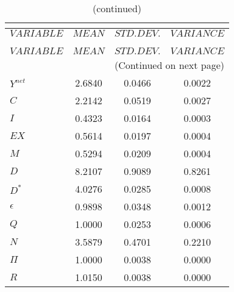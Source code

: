  
\begin{center}
\begin{longtable}{lccc} 
\caption{THEORETICAL MOMENTS}\\
 \label{Table:th_moments}\\
\toprule 
$VARIABLE  $	 & 	 $         MEAN$	 & 	 $    STD. DEV.$	 & 	 $     VARIANCE$\\
\midrule \endfirsthead 
\caption{(continued)}\\
 \toprule \\ 
$VARIABLE  $	 & 	 $         MEAN$	 & 	 $    STD. DEV.$	 & 	 $     VARIANCE$\\
\midrule \endhead 
\midrule \multicolumn{4}{r}{(Continued on next page)} \\ \bottomrule \endfoot 
\bottomrule \endlastfoot 
$Y^{net}   $	 & 	       2.6840	 & 	       0.0466	 & 	       0.0022 \\ 
$C         $	 & 	       2.2142	 & 	       0.0519	 & 	       0.0027 \\ 
$I         $	 & 	       0.4323	 & 	       0.0164	 & 	       0.0003 \\ 
$EX        $	 & 	       0.5614	 & 	       0.0197	 & 	       0.0004 \\ 
$M         $	 & 	       0.5294	 & 	       0.0209	 & 	       0.0004 \\ 
$D         $	 & 	       8.2107	 & 	       0.9089	 & 	       0.8261 \\ 
$D^{*}     $	 & 	       4.0276	 & 	       0.0285	 & 	       0.0008 \\ 
$\epsilon  $	 & 	       0.9898	 & 	       0.0348	 & 	       0.0012 \\ 
$Q         $	 & 	       1.0000	 & 	       0.0253	 & 	       0.0006 \\ 
$N         $	 & 	       3.5879	 & 	       0.4701	 & 	       0.2210 \\ 
$\Pi       $	 & 	       1.0000	 & 	       0.0038	 & 	       0.0000 \\ 
$R         $	 & 	       1.0150	 & 	       0.0038	 & 	       0.0000 \\ 
\end{longtable}
 \end{center}
